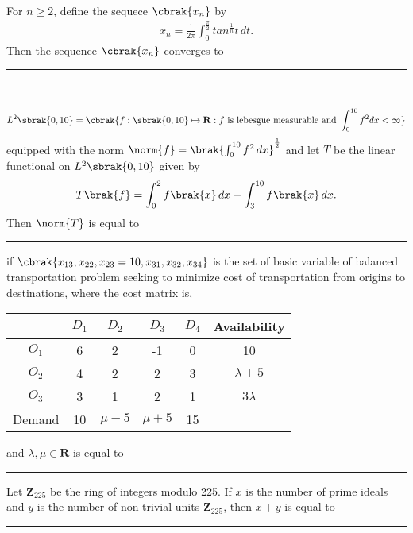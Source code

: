 		\item
		For $n \geq 2$, define the sequece $\cbrak{x_n}$ by 
		\begin{align*} 
			x_n = \frac{1}{2\pi}\int_0^{\frac{\pi}{2}} tan^{\frac{1}{n}}{t}\, dt. 
		\end{align*}
		Then the sequence $\cbrak{x_n}$ converges to \rule{2cm}{0.1pt}\\ 
		
		\hfill{}

		\item 
		\begin{align*}
			L^2\sbrak{0,10} = \cbrak{f:\sbrak{0,10}\mapsto \mathbf{R}: f \text{ is lebesgue measurable and }\int_0^{10}f^2dx < \infty}
		\end{align*}
		equipped with the norm $\norm{f} = \brak{\int_0^{10} f^2\, dx}^{\frac{1}{2}}$ and let $T$ be the linear functional on $L^2\sbrak{0,10}$ given by 
		\begin{align*}
			T\brak{f} = \int_0^2 f\brak{x}\, dx - \int_3^{10} f\brak{x}\, dx.
		\end{align*}
		Then $\norm{T}$ is equal to \rule{2cm}{0.1pt}
		
		\hfill{}

		\item 
		if $\cbrak{x_{13}, x_{22}, x_{23} = 10, x_{31}, x_{32}, x_{34}}$ is the set of basic variable of  balanced transportation problem seeking to minimize cost of transportation from origins to destinations, where the cost matrix is, 
		\begin{table}
			\centering
			\begin{tabular}{|c|c|c|c|c|c|}
\hline 
 & $D_1$ & $D_2$ & $D_3$ & $D_4$ & Availability\\
\hline
$O_1$ & 6 & 2 & -1 & 0 & 10 \\
\hline 
$O_2$ & 4 & 2 & 2 & 3 & $\lambda + 5$\\
\hline 
$O_3$ & 3 & 1 & 2 & 1 & $3\lambda$\\
\hline 
Demand & 10 & $\mu - 5$ & $\mu + 5$ & 15 & \\
\hline
\end{tabular}
		\end{table}
		and $\lambda, \mu \in \mathbf{R}$ is equal to \rule{2cm}{1pt}
		
		\hfill{}

		\item 
		Let $\mathbf{Z}_{225}$ be the ring of integers modulo 225. If $x$ is the number of prime ideals and $y$ is the number of non trivial units $\mathbf{Z}_{225}$, then $x + y$ is equal to \rule{2cm}{0.1pt}
		
